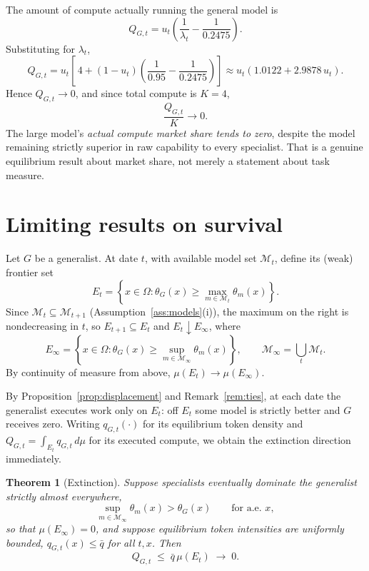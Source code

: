 \documentclass[11pt]{article}
\newtheorem{theorem}{Theorem}
\theoremstyle{definition}
\theoremstyle{remark}
\begin{document}
The amount of compute actually running the general model is
\begin{equation}
Q_{G,t} = u_t \left( \frac{1}{\lambda_t} - \frac{1}{0.2475} \right).
\end{equation}
Substituting for $\lambda_t$,
\begin{equation}
Q_{G,t}
= u_t \left[\, 4 + (1 - u_t) \left( \frac{1}{0.95} - \frac{1}{0.2475} \right) \right]
\approx u_t \left( 1.0122 + 2.9878\, u_t \right).
\end{equation}
Hence $Q_{G,t} \longrightarrow 0$, and since total compute is $K = 4$,
\begin{equation}
\frac{Q_{G,t}}{K} \longrightarrow 0.
\end{equation}
The large model's \emph{actual compute market share tends to zero}, despite the model remaining strictly superior in raw capability to every specialist. That is a genuine equilibrium result about market share, not merely a statement about task measure.

\section{Limiting results on survival}
\label{sec:limit}

Let $G$ be a generalist. At date $t$, with available model set $\mathcal{M}_t$, define its (weak) frontier set
\begin{equation}
E_t = \left\{ x \in \Omega : \theta_G(x) \ge \max_{m \in \mathcal{M}_t} \theta_m(x) \right\}.
\end{equation}
Since $\mathcal{M}_t \subseteq \mathcal{M}_{t+1}$ (Assumption~\ref{ass:models}(i)), the maximum on the right is nondecreasing in $t$, so $E_{t+1} \subseteq E_t$ and $E_t \downarrow E_\infty$, where
\begin{equation}
E_\infty = \left\{ x \in \Omega : \theta_G(x) \ge \sup_{m \in \mathcal{M}_\infty} \theta_m(x) \right\},
\qquad \mathcal{M}_\infty = \bigcup_t \mathcal{M}_t.
\end{equation}
By continuity of measure from above, $\mu(E_t) \to \mu(E_\infty)$.

By Proposition~\ref{prop:displacement} and Remark~\ref{rem:ties}, at each date the generalist executes work only on $E_t$: off $E_t$ some model is strictly better and $G$ receives zero. Writing $q_{G,t}(\cdot)$ for its equilibrium token density and $Q_{G,t} = \int_{E_t} q_{G,t}\, d\mu$ for its executed compute, we obtain the extinction direction immediately.

\begin{theorem}[Extinction]
\label{thm:extinction}
Suppose specialists eventually dominate the generalist strictly almost everywhere,
\begin{equation}
\sup_{m \in \mathcal{M}_\infty} \theta_m(x) > \theta_G(x) \qquad \text{for a.e. } x,
\end{equation}
so that $\mu(E_\infty) = 0$, and suppose equilibrium token intensities are uniformly bounded, $q_{G,t}(x) \le \bar q$ for all $t, x$. Then
\begin{equation}
Q_{G,t} \;\le\; \bar q\, \mu(E_t) \;\longrightarrow\; 0.
\end{equation}
\end{theorem}
\end{document}
